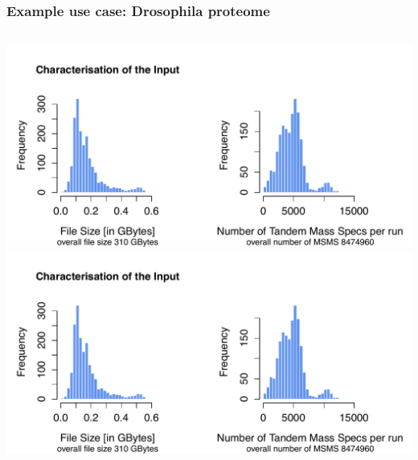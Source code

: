 \documentclass[english,serif,mathserif,xcolor=pdftex,dvipsnames,table]{beamer}
\begin{document}
\begin{frame}
  \frametitle{Example use case: Drosophila proteome}
  \begin{columns}
    \begin{column}{.30\textwidth}
      \includegraphics[viewport=10.0cm 0.0cm 20.0cm 10.0cm, clip, height=\columnwidth]{fig/ms}
      \\
      \includegraphics[viewport=0.0cm 0.0cm 10.0cm 10.0cm, clip, height=\columnwidth]{fig/ms}

\end{column}
\end{columns}
\end{frame}
\end{document}
